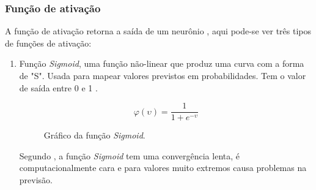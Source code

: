 \subsubsection*{Função de ativação}

A função de ativação retorna a saída de um neurônio \cite{haykin1999neural}, aqui pode-se ver três tipos de funções de ativação:

\begin{enumerate}
	\item Função \textit{Sigmoid}, uma função não-linear que produz uma curva com a forma de "S". Usada para mapear valores previstos em probabilidades. Tem o valor de saída entre 0 e 1 \cite{gharat2019what}.
	\begin{figure}[H]
	\caption{Gráfico da função \textit{Sigmoid}.}
	\begin{center}
		\begin{minipage}{0.45\textwidth}
			\begin{equation}
				\varphi(\upsilon) = \frac{1}{1 + e^{-\upsilon}}
			\end{equation}
		\end{minipage}
		\hfill
		\begin{minipage}{0.45\textwidth}
		\end{minipage}
	\end{center}
	\label{fig:grafico_sigmoid}
	\end{figure}
	Segundo , a função \textit{Sigmoid} tem uma convergência lenta, é computacionalmente cara e para valores muito extremos causa problemas na previsão.


\end{enumerate}
